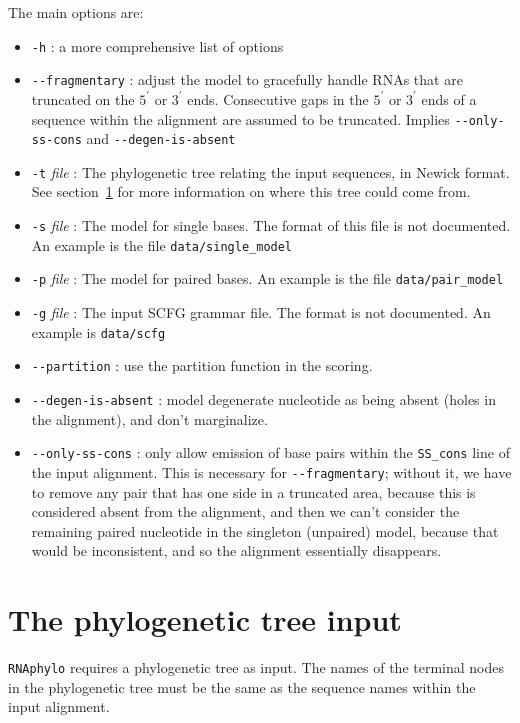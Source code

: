 \documentclass[letterpaper,12pt]{report}
\begin{document}
The main options are:
\begin{itemize}
\item {\tt -h} : a more comprehensive list of options
\item {\tt -{}-fragmentary} : adjust the model to gracefully handle RNAs that are truncated on the $5^\prime$ or $3^\prime$ ends.  Consecutive gaps in the $5^\prime$ or $3^\prime$ ends of a sequence within the alignment are assumed to be truncated.  Implies {\tt -{}-only-ss-cons} and {\tt -{}-degen-is-absent}
\item {\tt -t} {\it file} : The phylogenetic tree relating the input sequences, in Newick format.  See section~\ref{phyloTree} for more information on where this tree could come from.
\item {\tt -s} {\it file} : The model for single bases.  The format of this file is not documented.  An example is the file {\tt data/single\_model}
\item {\tt -p} {\it file} : The model for paired bases.  An example is the file {\tt data/pair\_model}
\item {\tt -g} {\it file} : The input SCFG grammar file.  The format is not documented.  An example is {\tt data/scfg}
\item {\tt -{}-partition} : use the partition function in the scoring.
\item {\tt -{}-degen-is-absent} : model degenerate nucleotide as being absent (holes in the alignment), and don't marginalize.
\item {\tt -{}-only-ss-cons} : only allow emission of base pairs within the {\tt SS\_cons} line of the input alignment.  This is necessary for {\tt -{}-fragmentary}; without it, we have to remove any pair that has one side in a truncated area, because this is considered absent from the alignment, and then we can't consider the remaining paired nucleotide in the singleton (unpaired) model, because that would be inconsistent, and so the alignment essentially disappears.
\end{itemize}

\section{The phylogenetic tree input}
\label{phyloTree}

{\tt RNAphylo} requires a phylogenetic tree as input. The names of the terminal nodes in the phylogenetic tree must be the same as the sequence names within the input alignment.
\end{document}
